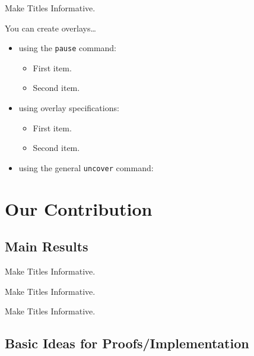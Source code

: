 \documentclass[10pt,serif, professionalfont]{beamer}
\begin{document}
\begin{frame}{Make Titles Informative.}

  You can create overlays\dots
  \begin{itemize}
  \item using the \texttt{pause} command:
    \begin{itemize}
    \item
      First item.
      \pause
    \item    
      Second item.
    \end{itemize}
  \item
    using overlay specifications:
    \begin{itemize}
    \item<3->
      First item.
    \item<4->
      Second item.
    \end{itemize}
  \item
    using the general \texttt{uncover} command:
    \begin{itemize}
    \end{itemize}
  \end{itemize}
\end{frame}




\section{Our Contribution}

\subsection{Main Results}

\begin{frame}{Make Titles Informative.}
\end{frame}

\begin{frame}{Make Titles Informative.}
\end{frame}

\begin{frame}{Make Titles Informative.}
\end{frame}


\subsection{Basic Ideas for Proofs/Implementation}
\end{document}

